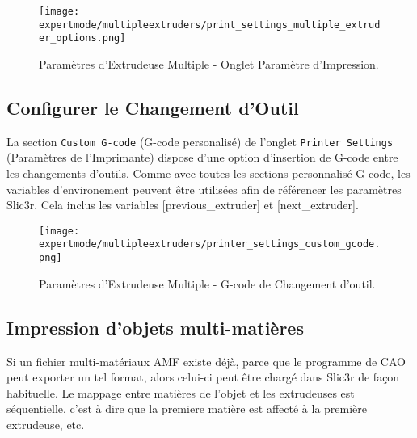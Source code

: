 \begin{figure}[H]
\centering
\texttt{[image: expertmode/multipleextruders/print\_settings\_multiple\_extruder\_options.png]}
\caption{Paramètres d'Extrudeuse Multiple - Onglet Paramètre d'Impression.}
\label{fig:advanced_multiple_extruder_options}
\end{figure}


\subsection{Configurer le Changement d'Outil} %
\label{sub:configuring_tool_changes}


La section \texttt{Custom G-code} (G-code personalisé) de l'onglet \texttt{Printer Settings} (Paramètres de l'Imprimante) dispose d'une option d'insertion de G-code entre les changements d'outils. Comme avec toutes les sections personnalisé G-code, les variables d'environement peuvent être utilisées afin de référencer les paramètres Slic3r.  Cela inclus les variables [previous\_extruder] et [next\_extruder].

\begin{figure}[H]
\centering
\texttt{[image: expertmode/multipleextruders/printer\_settings\_custom\_gcode.png]}
\caption{Paramètres d'Extrudeuse Multiple - G-code de Changement d'outil.}
\label{fig:printer_settings_custom_gcode}
\end{figure}



\subsection{Impression d'objets multi-matières} %
\label{sub:printing_multi_material_objects}

Si un fichier multi-matériaux AMF existe déjà, parce que le programme de CAO peut exporter un tel format, alors celui-ci peut être chargé dans Slic3r de façon habituelle. Le mappage entre matières de l'objet et les extrudeuses est séquentielle, c'est à dire que la premiere matière est affecté à la première extrudeuse, etc.



